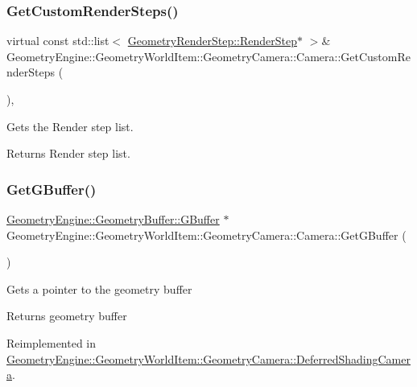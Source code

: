 \subsubsection{\texorpdfstring{GetCustomRenderSteps()}{GetCustomRenderSteps()}}
{\footnotesize\ttfamily virtual const std\+::list$<$ \mbox{\hyperlink{class_geometry_engine_1_1_geometry_render_step_1_1_render_step}{Geometry\+Render\+Step\+::\+Render\+Step}}$\ast$ $>$\& Geometry\+Engine\+::\+Geometry\+World\+Item\+::\+Geometry\+Camera\+::\+Camera\+::\+Get\+Custom\+Render\+Steps (\begin{DoxyParamCaption}{ }\end{DoxyParamCaption})\hspace{0.3cm}{\ttfamily [inline]}, {\ttfamily [virtual]}}

Gets the Render step list. \begin{DoxyReturn}{Returns}
Render step list. 
\end{DoxyReturn}
\mbox{\label{class_geometry_engine_1_1_geometry_world_item_1_1_geometry_camera_1_1_camera_a23673bed2b417962168e0bc5b8b37eb3}} 
\subsubsection{\texorpdfstring{GetGBuffer()}{GetGBuffer()}}
{\footnotesize\ttfamily \mbox{\hyperlink{class_geometry_engine_1_1_geometry_buffer_1_1_g_buffer}{Geometry\+Engine\+::\+Geometry\+Buffer\+::\+G\+Buffer}} $\ast$ Geometry\+Engine\+::\+Geometry\+World\+Item\+::\+Geometry\+Camera\+::\+Camera\+::\+Get\+G\+Buffer (\begin{DoxyParamCaption}{ }\end{DoxyParamCaption})\hspace{0.3cm}{\ttfamily [virtual]}}

Gets a pointer to the geometry buffer \begin{DoxyReturn}{Returns}
geometry buffer 
\end{DoxyReturn}


Reimplemented in \mbox{\hyperlink{class_geometry_engine_1_1_geometry_world_item_1_1_geometry_camera_1_1_deferred_shading_camera_aa37bfbf062ca20f0d41d5f29fbbc7959}{Geometry\+Engine\+::\+Geometry\+World\+Item\+::\+Geometry\+Camera\+::\+Deferred\+Shading\+Camera}}.

